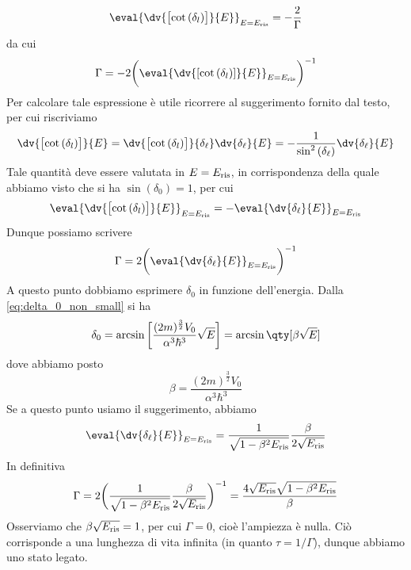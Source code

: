 \begin{soluzione}
   \begin{equation*}
      \eval{ \dv{ \bigl[ \cot{(\delta_l)} \bigr] }{E} }_{E=E_{\rm ris}}
      =-\frac{2}{\Gamma}
   \end{equation*}
   da cui
   \begin{equation*}
      \Gamma
      =-2 \biggl( \eval{ \dv{ [ \cot{(\delta_l)} ] }{E} }_{E=E_{\rm ris}} \biggr)^{-1}
   \end{equation*}
   Per calcolare tale espressione è utile ricorrere al suggerimento fornito dal testo, per cui riscriviamo
   \begin{equation*}
      \dv{ \bigl[ \cot{(\delta_l)} \bigr] }{E}
      =\dv{ \bigl[ \cot{(\delta_l)} \bigr] }{\delta_\ell} \dv{\delta_\ell}{E}
      =-\frac{1}{\sin^2{(\delta_\ell)}} \dv{\delta_\ell}{E}
   \end{equation*}
   Tale quantità deve essere valutata in $E=E_{\rm ris}$, in corrispondenza della quale abbiamo visto che si ha $\sin{(\delta_0)}=1$, per cui
   \begin{equation*}
      \eval{ \dv{ \bigl[ \cot{(\delta_l)} \bigr] }{E}}_{E=E_{\rm ris}}
      =- \eval{ \dv{\delta_\ell}{E} }_{E=E_{\rm ris}}
   \end{equation*}
   Dunque possiamo scrivere
   \begin{equation*}
      \Gamma=2 \biggl( \eval{ \dv{\delta_\ell}{E}}_{E=E_{\rm ris}} \biggr)^{-1}
   \end{equation*}
   A questo punto dobbiamo esprimere $\delta_0$ in funzione dell'energia. Dalla \eqref{eq:delta_0_non_small} si ha
   \begin{equation*}
      \delta_0
      =\arcsin{ \biggl[ \frac{(2 m)^{\frac{3}{2}} V_0}{\alpha^3 \hbar^3} \sqrt{E} \biggr] }
      =\arcsin{ \qty[ \beta \sqrt{E} ] }
   \end{equation*}
   dove abbiamo posto
   \begin{equation*}
      \beta
      =\frac{(2 m)^{\frac{3}{2}} V_0}{\alpha^3 \hbar^3}
   \end{equation*}
   Se a questo punto usiamo il suggerimento, abbiamo
   \begin{equation*}
      \eval{ \dv{\delta_\ell}{E} }_{E=E_{\rm ris}}
      =\frac{1}{\sqrt{1 - \beta^2 E_{\rm ris}}} \frac{\beta}{2\sqrt{E_{\rm ris}}}
   \end{equation*}
   In definitiva
   \begin{equation*}
      \Gamma
      =2 \biggl( \frac{1}{\sqrt{1 - \beta^2 E_{\rm ris}}} \frac{\beta}{2\sqrt{E_{\rm ris}}} \biggr)^{-1}
      =\frac{ 4 \sqrt{E_{\rm ris}} \sqrt{1 - \beta^2 E_{\rm ris}} }{\beta}
   \end{equation*}
   Osserviamo che $\beta \sqrt{E_{\rm ris}}=1$, per cui $\Gamma=0$, cioè l'ampiezza è nulla. Ciò corrisponde a una lunghezza di vita infinita (in quanto $\tau=1/\Gamma$), dunque abbiamo uno stato legato.
\end{soluzione}

\newpage
\setcounter{equation}{0}